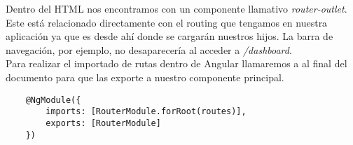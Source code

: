 Dentro del HTML nos encontramos con un componente llamativo \textit{router-outlet}. Este está relacionado directamente con el routing que tengamos en nuestra aplicación ya que es desde ahí donde se cargarán nuestros hijos. La barra de navegación, por ejemplo, no desaparecería al acceder a \textit{/dashboard}.
\\Para realizar el importado de rutas dentro de Angular llamaremos a \textit{\makeatletter@NgModule} al final del documento para que las exporte a nuestro componente principal.
\begin{verbatim}
    @NgModule({
        imports: [RouterModule.forRoot(routes)],
        exports: [RouterModule]
    })
\end{verbatim}